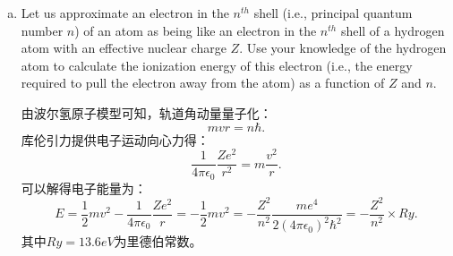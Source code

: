 \documentclass[reqno,a4paper,12pt]{amsart}
\begin{document}
\begin{enumerate}[(a)]
	\item Let us approximate an electron in the $n^{th}$ shell (i.e., principal quantum number $n$) of an atom as being like an electron in the $n^{th}$ shell of a hydrogen atom with an effective nuclear charge $Z$. Use your knowledge of the hydrogen atom to calculate the ionization energy of this electron (i.e., the energy required to pull the electron away from the atom) as a function of $Z$ and $n$.
	\begin{tcolorbox}[breakable, colback = black!5!white, colframe = black]
	由波尔氢原子模型可知，轨道角动量量子化：
	\[
		mvr = n\hbar.
	\]
	库伦引力提供电子运动向心力得：
	\[
		\frac{1}{4\pi\epsilon_0}\frac{Ze^2}{r^2} = m\frac{v^2}{r}.
	\]
	可以解得电子能量为：
	\[
		E = \frac{1}{2}mv^2 - \frac{1}{4\pi\epsilon_0}\frac{Ze^2}{r} = -\frac{1}{2}mv^2 = -\frac{Z^2}{n^2} \frac{me^4}{2(4\pi\epsilon_0)^2\hbar^2} = -\frac{Z^2}{n^2}\times Ry.
	\]
	其中$Ry = 13.6eV$为里德伯常数。
	\end{tcolorbox}
	

\end{enumerate}
\end{document}
